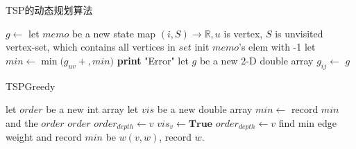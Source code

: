 \documentclass[UTF8,a4paper]{ctexart}
\begin{document}
\begin{algorithm}
    \caption{TSP的动态规划算法}\label{algotspdp}
    \begin{algorithmic}[1] %
        \State $g\gets$
        \State let {$memo$} be a new state map {$(i,S)\to \mathbb{R},u$ is vertex, $S$ is unvisited vertex-set, which contains all vertices in $set$} init $memo$'s elem with -1
        \EndFor
        \EndFunction
        \State
        \State {}
        \EndIf
        \State let {$min \gets \min(g_{uv}+$$,min)$}
        \EndFor
        \State {}
        \EndFunction
        \State
        \State {}
        \State \textbf{print} "Error"
        \State \Return
        \EndIf
        \State let {$g$} be a new 2-D double array
        \State {}
        \State $g_{ij}\gets $
        \EndFor
        \EndFor
        \State \Return $g$
        \EndFunction
    \end{algorithmic}
\end{algorithm}

\begin{algorithm}
    \caption{TSPGreedy}\label{algogreedy}
    \begin{algorithmic}[1] %
        \State let $order$ be a new int array
        \State let $vis$ be a new double array
        \State $min\gets$
        \State record $min$ and the $order$
        \EndFor
        \State \Return $order$
        \EndFunction
        \State
        \State $order_{depth}\gets v$
        \State {}
        \EndIf
        \State $vis_v\gets \textbf{True}$
        \State $order_{depth}\gets v$
        \State find min edge weight and record $min$ be $w(v,w)$, record $w$.
        \EndFor
        \State {}
        \EndFunction
    \end{algorithmic}
\end{algorithm}
\end{document}
